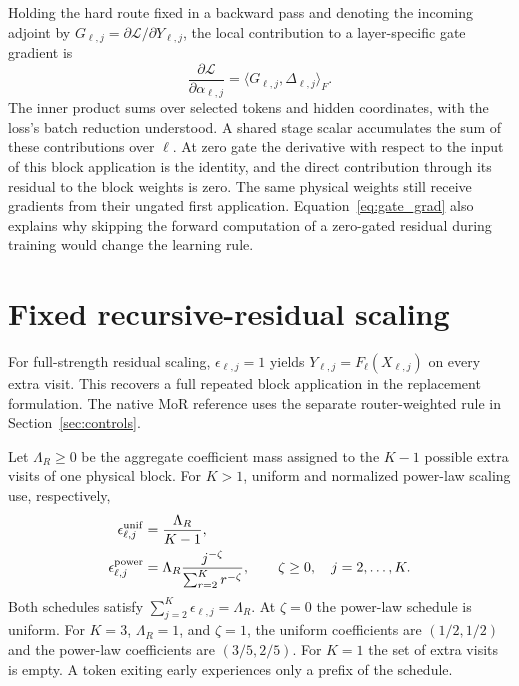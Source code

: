\documentclass[11pt,letterpaper]{article}
\begin{document}
Holding the hard route fixed in a backward pass and denoting the incoming adjoint by \(G_{\ell,j}=\partial\mathcal L/\partial Y_{\ell,j}\), the local contribution to a layer-specific gate gradient is
\begin{equation}
 \frac{\partial\mathcal L}{\partial\alpha_{\ell,j}}
   = \langle G_{\ell,j},\Delta_{\ell,j}\rangle_F.
 \label{eq:gate_grad}
\end{equation}
The inner product sums over selected tokens and hidden coordinates, with the loss's batch reduction understood. A shared stage scalar accumulates the sum of these contributions over \(\ell\). At zero gate the derivative with respect to the input of this block application is the identity, and the direct contribution through its residual to the block weights is zero. The same physical weights still receive gradients from their ungated first application. Equation~\eqref{eq:gate_grad} also explains why skipping the forward computation of a zero-gated residual during training would change the learning rule.

\section{Fixed recursive-residual scaling}
\label{app:fixed_recursive_scaling}
For full-strength residual scaling, \(\epsilon_{\ell,j}=1\) yields \(Y_{\ell,j}=F_\ell(X_{\ell,j})\) on every extra visit. This recovers a full repeated block application in the replacement formulation. The native MoR reference uses the separate router-weighted rule in Section~\ref{sec:controls}.

Let \(\Lambda_R\ge0\) be the aggregate coefficient mass assigned to the \(K-1\) possible extra visits of one physical block. For \(K>1\), uniform and normalized power-law scaling use, respectively,
\begin{align}
 \epsilon^{\rm unif}_{\ell,j}
   &=\frac{\Lambda_R}{K-1}, \label{eq:uniform_residual_scaling}\\
 \epsilon^{\rm power}_{\ell,j}
   &=\Lambda_R \frac{j^{-\zeta}}{\sum_{r=2}^{K}r^{-\zeta}},\qquad
     \zeta\ge0,\quad j=2,\ldots,K. \label{eq:normalized_power_scaling}
\end{align}
Both schedules satisfy \(\sum_{j=2}^K\epsilon_{\ell,j}=\Lambda_R\). At \(\zeta=0\) the power-law schedule is uniform. For \(K=3\), \(\Lambda_R=1\), and \(\zeta=1\), the uniform coefficients are \((1/2,1/2)\) and the power-law coefficients are \((3/5,2/5)\). For \(K=1\) the set of extra visits is empty. A token exiting early experiences only a prefix of the schedule.
\end{document}
